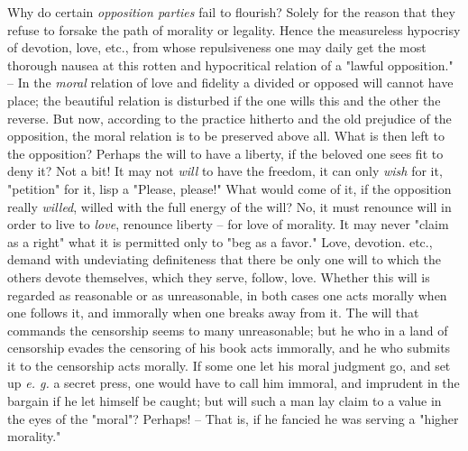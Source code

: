 \documentclass[a4paper]{book}
\begin{document}
Why do certain \textit{opposition parties} fail to flourish? Solely for the 
reason that they refuse to forsake the path of morality or legality. Hence the 
measureless hypocrisy of devotion, love, etc., from whose repulsiveness one 
may daily get the most thorough nausea at this rotten and hypocritical 
relation of a "{}lawful opposition."{} -- In the \textit{moral} relation of 
love and fidelity a divided or opposed will cannot have place; the beautiful 
relation is disturbed if the one wills this and the other the reverse. But 
now, according to the practice hitherto and the old prejudice of the 
opposition, the moral relation is to be preserved above all. What is then left 
to the opposition? Perhaps the will to have a liberty, if the beloved one sees 
fit to deny it? Not a bit! It may not \textit{will} to have the freedom, it 
can only \textit{wish} for it, "{}petition"{} for it, lisp a "{}Please, 
please!"{} What would come of it, if the opposition really \textit{willed}, 
willed with the full energy of the will? No, it must renounce will in order to 
live to \textit{love}, renounce liberty -- for love of morality. It may never 
"{}claim as a right"{} what it is permitted only to "{}beg as a favor."{} 
Love, devotion. etc., demand with undeviating definiteness that there be only 
one will to which the others devote themselves, which they serve, follow, 
love. Whether this will is regarded as reasonable or as unreasonable, in both 
cases one acts morally when one follows it, and immorally when one breaks away 
from it. The will that commands the censorship seems to many unreasonable; but 
he who in a land of censorship evades the censoring of his book acts 
immorally, and he who submits it to the censorship acts morally. If some one 
let his moral judgment go, and set up \textit{e. g.} a secret press, one would 
have to call him immoral, and imprudent in the bargain if he let himself be 
caught; but will such a man lay claim to a value in the eyes of the 
"{}moral"{}? Perhaps! -- That is, if he fancied he was serving a "{}higher 
morality."{}
\end{document}
